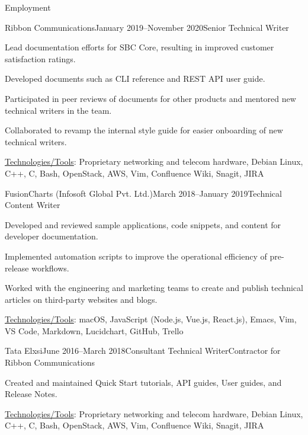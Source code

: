 \documentclass{resume} %
\begin{document}
\begin{rSection}{Employment}
\vspace{1cm}

\begin{rSubsection}{Ribbon Communications}{January 2019–November 2020}{Senior Technical Writer}{}
\item Lead documentation efforts for SBC Core, resulting in improved customer satisfaction ratings.
\item Developed documents such as CLI reference and REST API user guide.
\item Participated in peer reviews of documents for other products and mentored new technical writers in the team.
\item Collaborated to revamp the internal style guide for easier onboarding of new technical writers.
\item \underline{Technologies/Tools}: Proprietary networking and telecom hardware, Debian Linux, C++, C, Bash, OpenStack, AWS, Vim, Confluence Wiki, Snagit, JIRA
\end{rSubsection}


\begin{rSubsection}{FusionCharts (Infosoft Global Pvt. Ltd.)}{March 2018–January 2019}{Technical Content Writer}{}
\item Developed and reviewed sample applications, code snippets, and content for developer documentation.
\item Implemented automation scripts to improve the operational efficiency of pre-release workflows.
\item Worked with the engineering and marketing teams to create and publish technical articles on third-party websites and blogs.
\item \underline{Technologies/Tools}: macOS, JavaScript (Node.js, Vue.js, React.js), Emacs, Vim, VS Code, Markdown, Lucidchart, GitHub, Trello
\end{rSubsection}


\begin{rSubsection}{Tata Elxsi}{June 2016–March 2018}{Consultant Technical Writer}{Contractor for Ribbon Communications}
\item Created and maintained Quick Start tutorials, API guides, User guides, and Release Notes.
\item \underline{Technologies/Tools}: Proprietary networking and telecom hardware, Debian Linux, C++, C, Bash, OpenStack, AWS, Vim, Confluence Wiki, Snagit, JIRA
\end{rSubsection}


\end{rSection}
\end{document}
